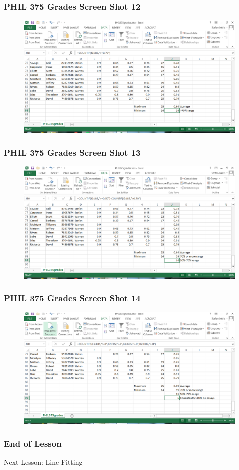 \documentclass[xcolor=dvipsnames]{beamer}
\begin{document}
\begin{frame}
  \frametitle{PHIL 375 Grades Screen Shot 12}
  \begin{figure}[h]
    \includegraphics[scale=.42]{./e12.PNG}
  \end{figure}
\end{frame}

\begin{frame}
  \frametitle{PHIL 375 Grades Screen Shot 13}
  \begin{figure}[h]
    \includegraphics[scale=.42]{./e13.PNG}
  \end{figure}
\end{frame}

\begin{frame}
  \frametitle{PHIL 375 Grades Screen Shot 14}
  \begin{figure}[h]
    \includegraphics[scale=.42]{./e14.PNG}
  \end{figure}
\end{frame}

\begin{frame}
  \frametitle{End of Lesson}
Next Lesson: Line Fitting
\end{frame}
\end{document}
